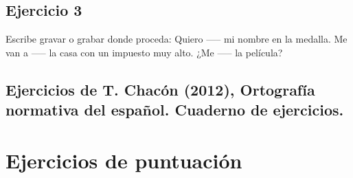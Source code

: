 \documentclass[12pt, a4paper, oneside]{report}
\begin{document}
\section{Ejercicio 3}
Escribe gravar o grabar donde
proceda:
Quiero ----- mi nombre en la medalla.
Me van a ----- la casa con un impuesto
muy alto.
¿Me ----- la película?

\section{Ejercicios de T. Chacón (2012), Ortografía
normativa del español. Cuaderno de
ejercicios.}

\chapter{Ejercicios de puntuación}
\end{document}
